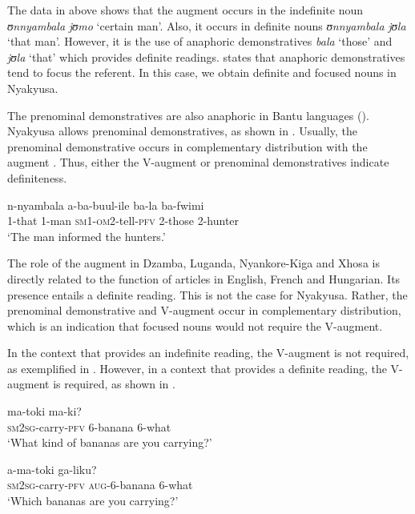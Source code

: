 \documentclass[output=paper]{langscibook}
\begin{document}
The data in  above shows that the augment occurs in the indefinite noun \textit{ʊnnyambala} \textit{jʊmo} ‘certain man’. Also, it occurs in definite nouns \textit{ʊnnyambala} \textit{jʊla} ‘that man’. However, it is the use of anaphoric demonstratives \textit{bala} ‘those’ and \textit{jʊla} ‘that’ which provides definite readings. \citet{Lyons1999} states that anaphoric demonstratives tend to focus the referent. In this case, we obtain definite and focused nouns in Nyakyusa. 

The prenominal demonstratives are also anaphoric in Bantu languages (\citealt{Visser2008, Kimambo2018a}). Nyakyusa allows prenominal demonstratives, as shown in . Usually, the prenominal demonstrative occurs in complementary distribution with the augment \citep{Lusekelo2009}. Thus, either the V-aug\-ment or prenominal demonstratives indicate definiteness.  

\ea%
    \label{ex:lusekelo:19}
   {n-nyambala}  {a-ba-buul-ile}  {ba-la}  {ba-fwimi}\\
  \textsc{1}{}-that  1-man  \textsc{sm1-om2}{}-tell-\textsc{pfv}  2-those  2-hunter\\
\glt  ‘The man informed the hunters.’
\z

The role of the augment in Dzamba, Luganda, Nyankore-Kiga and Xhosa is directly related to the function of articles in English, French and Hungarian. Its presence entails a definite reading. This is not the case for Nyakyusa. Rather, the prenominal demonstrative and V-aug\-ment occur in complementary distribution, which is an indication that focused nouns would not require the V-aug\-ment. 

In the context that provides an indefinite reading, the V-aug\-ment is not required, as exemplified in . However, in a context that provides a definite reading, the V-aug\-ment is required, as shown in . 

\ea%
    \label{ex:lusekelo:20}
   \ea\label{ex:lusekelo:20a}       {ma-toki}   {ma-ki?}\\
    \textsc{sm2sg-}carry-\textsc{pfv}  6-banana  6-what\\
    \glt ‘What kind of bananas are you carrying?’

  \ex\label{ex:lusekelo:20b}       {a-ma-toki}     {ga-liku?}\\
    \textsc{sm2sg-}carry-\textsc{pfv}  \textsc{aug}-6-banana  6-what\\
  \glt  ‘Which bananas are you carrying?’
\end{document}
